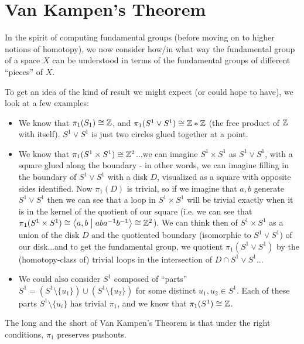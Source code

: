 \section{Van Kampen's Theorem}

In the spirit of computing fundamental groups (before moving on to higher notions of homotopy), we now consider how/in what way the fundamental group of a space $X$ can be understood in terms of the fundamental groups of different ``pieces'' of $X$.
\begin{boxexample}
To get an idea of the kind of result we might expect (or could hope to have), we look at a few examples:
    \begin{itemize}
    \item We know that $\pi_1(S_1)\cong \mathbb{Z}$, and $\pi_1(S^1\vee S^1)\cong \mathbb{Z}*\mathbb{Z}$ (the free product of $\mathbb{Z}$ with itself). $S^1\vee S^1$ is just two circles glued together at a point.
    \item We know that $\pi_1(S^1\times S^1)\cong \mathbb{Z}^2$...we can imagine $S^1\times S^1$ as $S^1\vee S^1$, with a square glued along the boundary - in other words, we can imagine filling in the boundary of $S^1\vee S^1$ with a disk $D$, visualized as a square with opposite sides identified. Now  $\pi_1(D)$ is trivial, so if we imagine that $a,b$ generate $S^1\vee S^1$ then we can see that a loop in $S^1\times S^1$ will be trivial exactly when it is in the kernel of the quotient of our square (i.e. we can see that $\pi_1(S^1\times S^1)\cong \left\langle a,b \; \middle| \; aba^{-1}b^{-1} \right\rangle \cong \mathbb{Z}^2$). We can think then of $S^1\times S^1$ as a union of the disk $D$ and the quotiented boundary (isomorphic to $S^1\vee S^1$) of our disk...and to get the fundamental group, we quotient $\pi_1(S^1\vee S^1)$ by the (homotopy-class of) trivial loops in the intersection of $D\cap S^1\vee S^1$...
    \item We could also consider $S^1$ composed of ``parts'' $S^1=(S^1\setminus \{u_1\})\cup (S^1\setminus \{u_2\})$ for some distinct $u_1, u_2\in S^1$. Each of these parts $S^1\setminus \{u_i\}$ has trivial $\pi_1$, and we know that $\pi_1(S^1)\cong \mathbb{Z}$. \sorry
\end{itemize}
    
\end{boxexample}

The long and the short of Van Kampen's Theorem is that under the right conditions, $\pi_1$ preserves pushouts.


